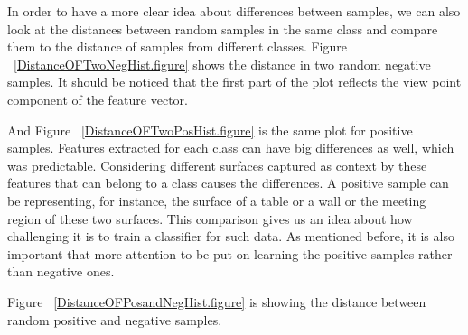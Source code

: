 In order to have a more clear idea about differences between samples, we can also look at the distances between random samples
in the same class and compare them to the distance of samples from different classes. 
Figure ~\ref{DistanceOFTwoNegHist.figure} shows the distance in two random negative samples. 
It should be noticed that the first part of the plot reflects the view point component of the feature vector.
 


And Figure ~\ref{DistanceOFTwoPosHist.figure} is the same plot for positive samples. 
Features extracted for each class can have big differences as well, which was predictable. 
Considering different surfaces captured as context by these features that can belong to a class causes the differences. 
A positive sample can be representing, for instance, the surface of a table or a wall or the meeting region of these 
two surfaces. 
This comparison gives us an idea about how challenging it is to train a classifier for such data.
As mentioned before, it is also important that more attention to be put on learning the positive samples rather than 
negative ones. 



Figure ~\ref{DistanceOFPosandNegHist.figure} is showing the distance between random positive and negative samples.


